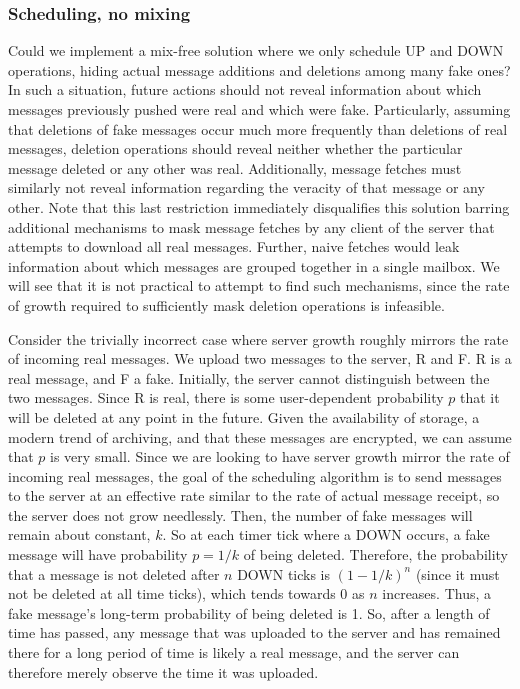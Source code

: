 \documentclass[pageno]{jpaper}
\begin{document}
\subsubsection{Scheduling, no mixing}
Could we implement a mix-free solution where we only schedule UP and DOWN operations, hiding actual message additions and deletions among many fake ones? In such a situation, future actions should not reveal information about which messages previously pushed were real and which were fake. Particularly, assuming that deletions of fake messages occur much more frequently than deletions of real messages, deletion operations should reveal neither whether the particular message deleted or any other was real. Additionally, message fetches must similarly not reveal information regarding the veracity of that message or any other. Note that this last restriction immediately disqualifies this solution barring additional mechanisms to mask message fetches by any client of the server that attempts to download all real messages. Further, naive fetches would leak information about which messages are grouped together in a single mailbox. We will see that it is not practical to attempt to find such mechanisms, since the rate of growth required to sufficiently mask deletion operations is infeasible.

Consider the trivially incorrect case where server growth roughly mirrors the rate of incoming real messages. We upload two messages to the server, R and F. R is a real message, and F a fake. Initially, the server cannot distinguish between the two messages. Since R is real, there is some user-dependent probability $p$ that it will be deleted at any point in the future. Given the availability of storage, a modern trend of archiving, and that these messages are encrypted, we can assume that $p$ is very small. Since we are looking to have server growth mirror the rate of incoming real messages, the goal of the scheduling algorithm is to send messages to the server at an effective rate similar to the rate of actual message receipt, so the server does not grow needlessly. Then, the number of fake messages will remain about constant, $k$. So at each timer tick where a DOWN occurs, a fake message will have probability $p=1/k$ of being deleted. Therefore, the probability that a message is not deleted after $n$ DOWN ticks is $(1-1/k)^n$ (since it must not be deleted at all time ticks), which tends towards 0 as $n$ increases. Thus, a fake message's long-term probability of being deleted is 1. So, after a length of time has passed, any message that was uploaded to the server and has remained there for a long period of time is likely a real message, and the server can therefore merely observe the time it was uploaded.
\end{document}
